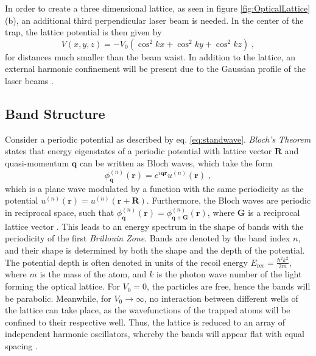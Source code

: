 In order to create a three dimensional lattice, as seen in figure \ref{fig:OpticalLattice}(b), an additional third perpendicular laser beam is needed. In the center of the trap, the lattice potential is then given by
\begin{equation}
	V(x,y,z) = - V_0 \left( \cos^2{k x } + \cos^2{k y } + \cos^2{k z } \right) \; , \label{eq:3Dlattice}
\end{equation}
for distances much smaller than the beam waist. In addition to the lattice, an external harmonic confinement will be present due to the Gaussian profile of the laser beams \cite{manybodyBloch}.

\subsection{Band Structure}
Consider a periodic potential as described by eq. \eqref{eq:standwave}. \textit{Bloch's Theorem} states that energy eigenstates of a periodic potential with lattice vector $\boldsymbol{R}$ and quasi-momentum $\boldsymbol{q}$ can be written as Bloch waves, which take the form
\begin{equation}
	\phi_{\boldsymbol{q}}^{(n)}(\boldsymbol{r}) = e^{i \boldsymbol{q} \boldsymbol{r}} u^{(n)}(\boldsymbol{r}) \; ,
\end{equation}
which is a plane wave modulated by a function with the same periodicity as the potential $u^{(n)}(\boldsymbol{r}) = u^{(n)}(\boldsymbol{r} + \boldsymbol{R})$. Furthermore, the Bloch waves are periodic in reciprocal space, such that $\phi_{\boldsymbol{q}}^{(n)}(\boldsymbol{r}) = \phi_{\boldsymbol{q} + \boldsymbol{G}}^{(n)}(\boldsymbol{r})$, where $\boldsymbol{G}$ is a reciprocal lattice vector \cite{kittel}.
This leads to an energy spectrum in the shape of bands with the periodicity of the first \textit{Brillouin Zone}. Bands are denoted by the band index $n$, and their shape is determined by both the shape and the depth of the potential. The potential depth is often denoted in units of the recoil energy $E_{\mathrm{rec}} = \frac{\hbar ^2 k^2}{2 m}$, where $m$ is the mass of the atom, and $k$ is the photon wave number of the light forming the optical lattice. For $V_0 = 0$, the particles are free, hence the bands will be parabolic. Meanwhile, for $V_0 \rightarrow \infty$, no interaction between different wells of the lattice can take place, as the wavefunctions of the trapped atoms will be confined to their respective well. Thus, the lattice is reduced to an array of independent harmonic oscillators, whereby the bands will appear flat with equal spacing \cite{greiner}. 

